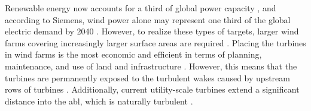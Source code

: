 


 











Renewable energy now accounts for a third of global power capacity \cite{RenEnThirty}, and according to Siemens, wind power alone may represent one third of the global electric demand by 2040 \cite{WindThirty}. However, to realize these types of targets, larger wind farms covering increasingly larger surface areas are required \cite{Meyers2012, Stevens2017}. Placing the turbines in wind farms is the most economic and efficient in terms of planning, maintenance, and use of land and infrastructure \cite{Neunaber}. However, this means that the turbines are permanently exposed to the turbulent wakes caused by upstream rows of turbines \cite{Tossas2014}. Additionally, current utility-scale turbines extend a significant distance into the \gls{abl}, which is naturally turbulent \cite{Neunaber, Tossas2014}. 

